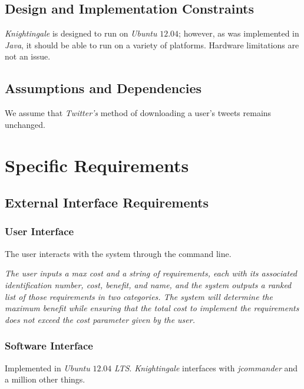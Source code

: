\documentclass[a4paper, 12pt]{article}
\begin{document}
\subsection{Design and Implementation Constraints} \label{sec:constraints}
\begin{adjustwidth}{2em}{0pt}
\textit{Knightingale} is designed to run on \textit{Ubuntu} $12.04$; however, as was implemented in \textit{Java}, it should be able to run on a variety of platforms. Hardware limitations are not an issue.
\end{adjustwidth}

\subsection{Assumptions and Dependencies} \label{sec:and}
\begin{adjustwidth}{2em}{0pt}
We assume that \textit{Twitter's} method of downloading a user's tweets remains unchanged. 
\end{adjustwidth}

\section{Specific Requirements} \label{sec:specificreq}
\subsection{External Interface Requirements} \label{sec:eir}
\subsubsection{User Interface} \label{sec:ui}
\begin{adjustwidth}{3em}{0pt}
The user interacts with the system through the command line. \newline

\noindent \textit{The user inputs a max cost and a string of 
requirements, each with its associated identification number, cost, benefit, and name, and the system outputs 
a ranked list of those requirements in two categories. The system will determine the maximum benefit while 
ensuring that the total cost to implement the requirements does not exceed the cost 
parameter given by the user.}
\end{adjustwidth}

\subsubsection{Software Interface} \label{sec:softi}
\begin{adjustwidth}{3em}{0pt}
Implemented in \textit{Ubuntu} $12.04$ \textit{LTS}. \textit{Knightingale} interfaces with \textit{jcommander} and a million other things.
\end{adjustwidth}
\end{document}
